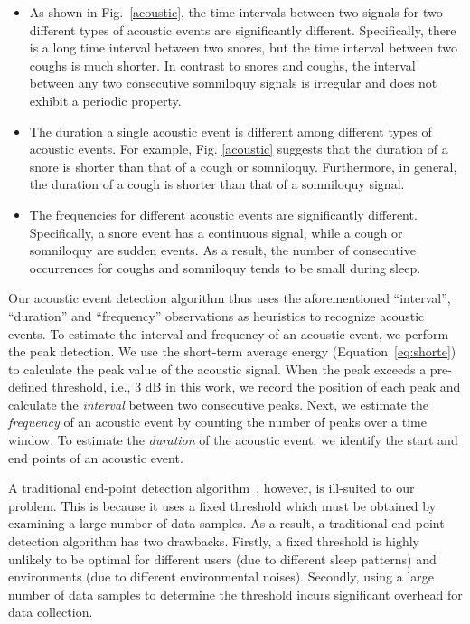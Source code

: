  \begin{itemize}
\item As shown in Fig.~\ref{acoustic}, the time intervals between two signals for two different types of acoustic events are
    significantly different. Specifically, there is a long time interval between two snores, but the time interval between two coughs is
    much shorter. In contrast to snores and coughs, the interval between any two consecutive somniloquy signals is irregular and does not
    exhibit a periodic property.
 \item The duration a single acoustic event is different among different types of acoustic events. For example, Fig. \ref{acoustic}
     suggests that the duration of a snore is shorter than that of a cough or somniloquy. Furthermore, in general, the duration of a
     cough is shorter than that of a somniloquy signal.
\item The frequencies for different acoustic events are significantly different. Specifically, a snore event has a continuous signal,
    while a cough or somniloquy are sudden events. As a result, the number of consecutive occurrences for coughs and somniloquy tends to
    be small during sleep.
\end{itemize}


Our acoustic event detection algorithm thus uses the aforementioned ``interval'', ``duration'' and ``frequency'' observations as heuristics
to recognize acoustic events. To estimate the interval and frequency of an acoustic event, we perform the peak detection. We use the
short-term average energy (Equation~\ref{eq:shorte}) to calculate the peak value of the acoustic signal. When the peak exceeds a
pre-defined threshold, i.e., 3 dB in this work, we record the position of each peak and calculate the \emph{interval} between two
consecutive peaks. Next, we estimate the \emph{frequency} of an acoustic event by counting the number of peaks over a time window. To
estimate the \emph{duration} of the acoustic event, we identify the start and end points of an acoustic event.

A traditional end-point detection algorithm~\cite{stowell2015detection}, however, is ill-suited to our problem. This is because it uses a
fixed threshold which must be obtained by examining a large number of data samples. As a result, a traditional end-point detection
algorithm has two drawbacks. Firstly, a fixed threshold is highly unlikely to be optimal for different users (due to different sleep
patterns) and environments (due to different environmental noises). Secondly, using a large number of data samples to determine the
threshold incurs significant overhead for data collection.


